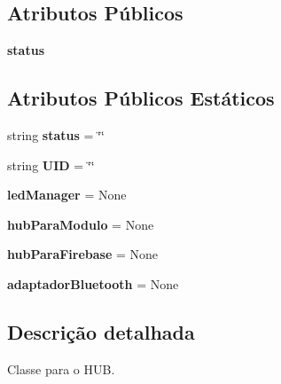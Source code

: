 \subsection*{Atributos Públicos}
\begin{DoxyCompactItemize}
\item 
{\bfseries status}\hypertarget{classhub_1_1_hub_aca0fde3216b7d279e6619aed32bfa418}{}\label{classhub_1_1_hub_aca0fde3216b7d279e6619aed32bfa418}

\end{DoxyCompactItemize}
\subsection*{Atributos Públicos Estáticos}
\begin{DoxyCompactItemize}
\item 
string {\bfseries status} = \char`\"{}\char`\"{}\hypertarget{classhub_1_1_hub_a5b81b3d458d8bea39e1a6aa5122ae5f0}{}\label{classhub_1_1_hub_a5b81b3d458d8bea39e1a6aa5122ae5f0}

\item 
string {\bfseries U\+ID} = \char`\"{}\char`\"{}\hypertarget{classhub_1_1_hub_ab0675c400cb26d7ecf6c7e8216b38f88}{}\label{classhub_1_1_hub_ab0675c400cb26d7ecf6c7e8216b38f88}

\item 
{\bfseries led\+Manager} = None\hypertarget{classhub_1_1_hub_a1072169bef5f5cfc46957270c95ac0e3}{}\label{classhub_1_1_hub_a1072169bef5f5cfc46957270c95ac0e3}

\item 
{\bfseries hub\+Para\+Modulo} = None\hypertarget{classhub_1_1_hub_ad76ddaf14bf717d58801e482ec8170b5}{}\label{classhub_1_1_hub_ad76ddaf14bf717d58801e482ec8170b5}

\item 
{\bfseries hub\+Para\+Firebase} = None\hypertarget{classhub_1_1_hub_adeb7bfdecbaeb53c2b288e7e1fd9e7fd}{}\label{classhub_1_1_hub_adeb7bfdecbaeb53c2b288e7e1fd9e7fd}

\item 
{\bfseries adaptador\+Bluetooth} = None\hypertarget{classhub_1_1_hub_a1b5657982fcd346c9733253e842b0e82}{}\label{classhub_1_1_hub_a1b5657982fcd346c9733253e842b0e82}

\end{DoxyCompactItemize}


\subsection{Descrição detalhada}
Classe para o H\+UB. 

